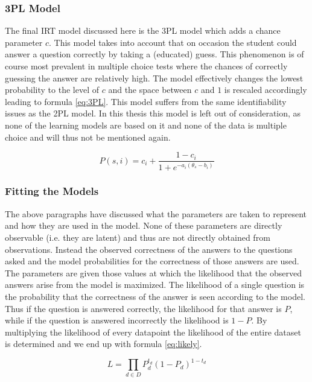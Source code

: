 \documentclass{scrartcl}
\begin{document}
\subsubsection{3PL Model}
The final IRT model discussed here is the 3PL model which adds a chance parameter $c$. This model takes into account that on occasion the student could answer a question correctly by taking a (educated) guess. This phenomenon is of course most prevalent in multiple choice tests where the chances of correctly guessing the answer are relatively high. The model effectively changes the lowest probability to the level of $c$ and the space between $c$ and $1$ is rescaled accordingly leading to formula \ref{eq:3PL}. This model suffers from the same identifiability issues as the 2PL model. In this thesis this model is left out of consideration, as none of the learning models are based on it and none of the data is multiple choice and will thus not be mentioned again. 

\begin{equation}
\label{eq:3PL}
P(s,i)= c_{i} + \frac{1-c_{i}}{1+e^{-a_{i}(\theta_{s} - b_{i})}}
\end{equation}

\subsubsection{Fitting the Models}
The above paragraphs have discussed what the parameters are taken to represent and how they are used in the model. None of these parameters are directly observable (i.e. they are latent) and thus are not directly obtained from observations. Instead the observed correctness of the answers to the questions asked and the model probabilities for the correctness of those answers are used. The parameters are given those values at which the likelihood that the observed answers arise from the model is maximized. The likelihood of a single question is the probability that the correctness of the answer is seen according to the model. Thus if the question is answered correctly, the likelihood for that answer is $P$, while if the question is answered incorrectly the likelihood is $1-P$. By multiplying the likelihood of every datapoint the likelihood of the entire dataset is determined and we end up with formula \ref{eq:likely}.

\begin{equation}
\label{eq:likely}
L=\prod_{d \in D} P_{d}^{t_d}  (1- P_{d})^{1-t_d}
\end{equation}
\end{document}
